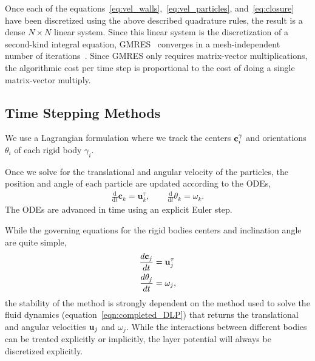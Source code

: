 \documentclass[preprint, 10pt]{elsarticle}
\begin{document}
Once each of the
equations~\eqref{eq:vel_walls},~\eqref{eq:vel_particles},
and~\eqref{eq:closure} have been discretized using the above described
quadrature rules, the result is a dense $N \times N$ linear system.
Since this linear system is the discretization of a second-kind integral
equation, GMRES~\cite{Saad1986} converges in a mesh-independent number of
iterations~\cite{cam-ips-kel-mey-xue1996}.  Since GMRES only requires
matrix-vector multiplications, the algorithmic cost per time step is
proportional to the cost of doing a single matrix-vector multiply.


\subsection{Time Stepping Methods}
We use a Lagrangian formulation where we track the centers
${\mathbf{c}}_i^\gamma$ and orientations $\theta_i$ of each rigid body
$\gamma_i$. 

Once we solve for the translational and angular velocity of the
particles, the position and angle of each particle are updated according
to the ODEs,
\begin{align*}
  \frac{\text{d}}{\text{d}t}\mathbf{c}_k = \mathbf{u}^\tau_k, \qquad
  \frac{\text{d}}{\text{d}t}\theta_k =\omega_k.
\end{align*}
The ODEs are advanced in time using an explicit Euler step. 

While the governing equations for the rigid bodies centers and
inclination angle are quite simple,
\begin{align*}
  \frac{d{\mathbf{c}}_j}{dt} &= {\mathbf{u}}_j^\tau \\
  \frac{d\theta_j}{dt} &=\omega_j,
\end{align*}
the stability of the method is strongly dependent on the method used to
solve the fluid dynamics (equation~\eqref{eqn:completed_DLP}) that
returns the translational and angular velocities ${\mathbf{u}}_j$ and $\omega_j$.
While the interactions between different bodies can be treated
explicitly or implicitly, the layer potential will always be discretized
explicitly.
\end{document}
